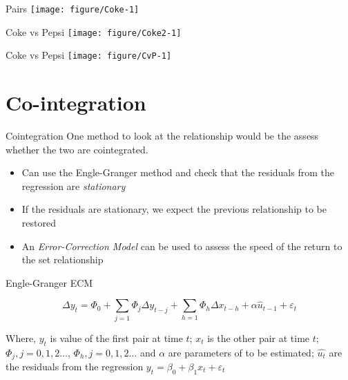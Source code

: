 \documentclass[14pt,xcolor=pdftex,dvipsnames,table]{beamer}\usepackage[]{graphicx}\usepackage[]{color}
\makeatletter
\def\maxwidth{ %
  \ifdim\Gin@nat@width>\linewidth
    \linewidth
  \else
    \Gin@nat@width
  \fi
}
\newenvironment{knitrout}{}{} %
\makeatother
\begin{document}
\begin{frame}{Pairs}
\begin{knitrout}
\color{fgcolor}
\texttt{[image: figure/Coke-1]} 

\end{knitrout}
\end{frame}

\begin{frame}{Coke vs Pepsi}
\begin{knitrout}
\color{fgcolor}
\texttt{[image: figure/Coke2-1]} 

\end{knitrout}
\end{frame}

\begin{frame}{Coke vs Pepsi}
\begin{knitrout}
\color{fgcolor}
\texttt{[image: figure/CvP-1]} 

\end{knitrout}
\end{frame}

\section{Co-integration}
\begin{frame}{Cointegration}
One method to look at the relationship would be the assess whether the two are cointegrated.
\pause
\begin{itemize}[<+-| alert@+>]
\item Can use the Engle-Granger method and check that the residuals from the regression are \emph{stationary}
\item If the residuals are stationary, we expect the previous relationship to be restored
\item An \emph{Error-Correction Model} can be used to assess the speed of the return to the set relationship
\end{itemize}
\end{frame}

\begin{frame}{Engle-Granger ECM}
\begin{block}{}
\begin{equation*}
\Delta y_t = \Phi_0 + \sum_{j=1} \Phi_j \Delta y_{t-j} + \sum_{h=1} \Phi_h \Delta x_{t-h} + \alpha \hat{u}_{t-1} + \varepsilon_t
\end{equation*}
\end{block}
Where, $y_t$ is value of the first pair at time $t$; $x_t$ is the other pair at time $t$; $\Phi_j, j = 0, 1, 2 \dots$, $\Phi_h, j = 0, 1, 2 \dots$  and $\alpha$ are parameters of to be estimated; $\hat{u_t}$ are the residuals from the regression $y_t = \beta_0 + \beta_1 x_t + \varepsilon_t$
\end{frame}
  
\end{document}
